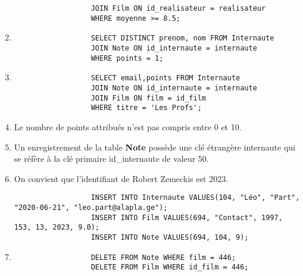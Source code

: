 \documentclass[a4paper,10pt,article,firamath]{nsi}
\begin{document}
\begin{enumerate}
\begin{verbatim}
                  JOIN Film ON id_realisateur = realisateur
                  WHERE moyenne >= 8.5;
            \end{verbatim}
      \item \begin{verbatim}
                  SELECT DISTINCT prenom, nom FROM Internaute
                  JOIN Note ON id_internaute = internaute
                  WHERE points = 1;
            \end{verbatim}
      \item \begin{verbatim}
                  SELECT email,points FROM Internaute
                  JOIN Note ON id_internaute = internaute
                  JOIN Film ON film = id_film
                  WHERE titre = 'Les Profs';
            \end{verbatim}
      \item Le nombre de points attribués n'est pas compris entre 0 et 10.
      \item Un enregistrement de la table \textbf{Note} possède une clé étrangère internaute qui se réfère à la clé primaire id\_internaute de valeur 50.
      \item On convient que l'identifiant de Robert Zemeckis est 2023.
            \begin{verbatim}
                  INSERT INTO Internaute VALUES(104, "Léo", "Part", "2020-06-21", "leo.part@alapla.ge");
                  INSERT INTO Film VALUES(694, "Contact", 1997, 153, 13, 2023, 9.0);
                  INSERT INTO Note VALUES(694, 104, 9);
            \end{verbatim}
      \item  \begin{verbatim}
                  DELETE FROM Note WHERE film = 446;
                  DELETE FROM Film WHERE id_film = 446;
            \end{verbatim}
\end{enumerate}
\end{document}
